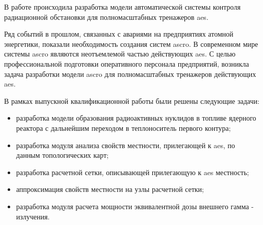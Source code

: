 
В работе происходила разработка модели автоматической системы контроля радиационной обстановки для полномасштабных 
тренажеров \ac{aes}. 

Ряд событий в прошлом, связанных с авариями на предприятиях атомной энергетики, показали необходимость создания систем 
\ac{ascro}. В современном мире системы \ac{ascro} являются неотъемлемой частью действующих \ac{aes}. С целью 
профессиональной подготовки оперативного персонала предприятий, возникла задача разработки модели 
\ac{ascro} для полномасштабных тренажеров действующих \ac{aes}.

В рамках выпускной квалификационной работы были решены следующие задачи:

\begin{itemize}
  \item разработка модели образования радиоактивных нуклидов в топливе ядерного реактора с дальнейшим переходом в 
  	теплоноситель первого контура;
  \item разработка модуля анализа свойств местности, прилегающей к \ac{aes}, по данным топологических карт;
  \item разработка расчетной сетки, описывающей прилегающую к \ac{aes} местность;
  \item аппроксимация свойств местности на узлы расчетной сетки;
  \item разработка модуля расчета мощности эквивалентной дозы внешнего гамма - излучения.
\end{itemize}
